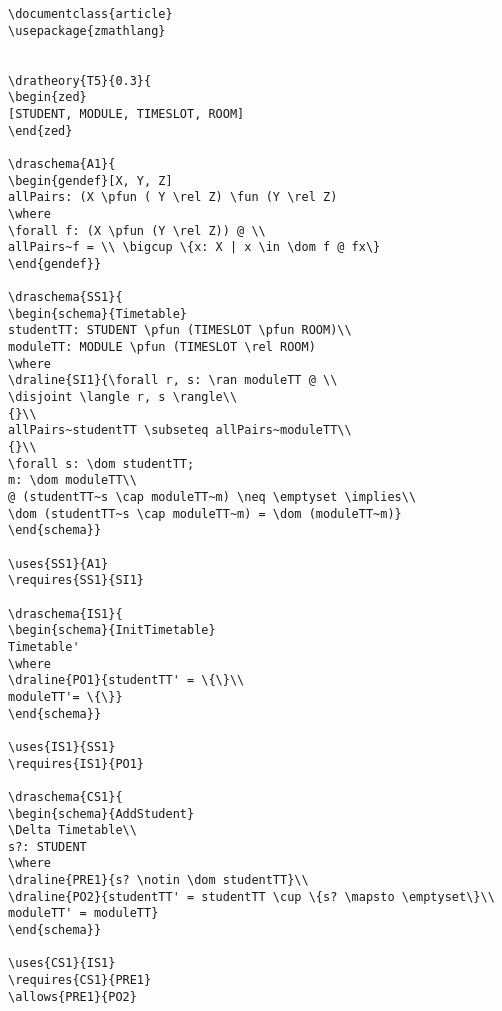 \begin{verbatim}
\documentclass{article}
\usepackage{zmathlang}


\dratheory{T5}{0.3}{
\begin{zed}
[STUDENT, MODULE, TIMESLOT, ROOM]
\end{zed}

\draschema{A1}{
\begin{gendef}[X, Y, Z]
allPairs: (X \pfun ( Y \rel Z) \fun (Y \rel Z)
\where
\forall f: (X \pfun (Y \rel Z)) @ \\
allPairs~f = \\ \bigcup \{x: X | x \in \dom f @ fx\}
\end{gendef}}

\draschema{SS1}{
\begin{schema}{Timetable}
studentTT: STUDENT \pfun (TIMESLOT \pfun ROOM)\\
moduleTT: MODULE \pfun (TIMESLOT \rel ROOM)
\where
\draline{SI1}{\forall r, s: \ran moduleTT @ \\
\disjoint \langle r, s \rangle\\
{}\\
allPairs~studentTT \subseteq allPairs~moduleTT\\
{}\\
\forall s: \dom studentTT; 
m: \dom moduleTT\\
@ (studentTT~s \cap moduleTT~m) \neq \emptyset \implies\\
\dom (studentTT~s \cap moduleTT~m) = \dom (moduleTT~m)}
\end{schema}}

\uses{SS1}{A1}
\requires{SS1}{SI1}

\draschema{IS1}{
\begin{schema}{InitTimetable}
Timetable'
\where
\draline{PO1}{studentTT' = \{\}\\
moduleTT'= \{\}}
\end{schema}}

\uses{IS1}{SS1}
\requires{IS1}{PO1}

\draschema{CS1}{
\begin{schema}{AddStudent}
\Delta Timetable\\
s?: STUDENT
\where
\draline{PRE1}{s? \notin \dom studentTT}\\
\draline{PO2}{studentTT' = studentTT \cup \{s? \mapsto \emptyset\}\\
moduleTT' = moduleTT}
\end{schema}}

\uses{CS1}{IS1}
\requires{CS1}{PRE1}
\allows{PRE1}{PO2}


\end{verbatim}
